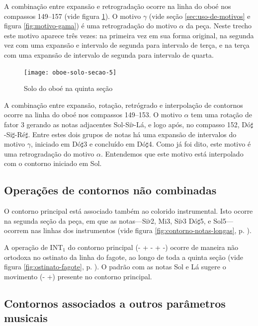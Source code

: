 A combinação entre expansão e retrogradação ocorre na linha do oboé
nos compassos 149--157 (vide figura \ref{fig:oboe-solo-secao-5}). O
motivo $\gamma$ (vide seção \ref{sec:uso-de-motivos} e figura
\ref{fig:motivo-gama}) é uma retrogradação do motivo $\alpha$ da
peça. Neste trecho este motivo aparece três vezes: na primeira vez em
sua forma original, na segunda vez com uma expansão e intervalo de
segunda para intervalo de terça, e na terça com uma expansão de
intervalo de segunda para intervalo de quarta.

\begin{figure}
  \centering
  \texttt{[image: oboe-solo-secao-5]}
  \caption{Solo do oboé na quinta seção}
  \label{fig:oboe-solo-secao-5}
\end{figure}

A combinação entre expansão, rotação, retrógrado e interpolação de
contornos ocorre na linha do oboé nos compassos 149--153. O motivo
$\alpha$ tem uma rotação de fator 3 gerando as notas adjacentes
Sol-Si$\flat$-Lá, e logo após, no compasso 152,
Dó$\sharp$-Si$\sharp$-Ré$\sharp$. Entre estes dois grupos de notas há
uma expansão de intervalos do motivo $\gamma$, iniciado em Dó$\sharp$3
e concluído em Dó$\sharp$4. Como já foi dito, este motivo é uma
retrogradação do motivo $\alpha$. Entendemos que este motivo está
interpolado com o contorno iniciado em Sol.

\subsection{Operações de contornos não combinadas}
\label{sec:cont-nao-comb}

O contorno principal \contpr{} está associado também ao colorido
instrumental. Isto ocorre na segunda seção da peça, em que as
notas---Si$\flat$2, Mi3, Si$\flat$3 Dó$\sharp$5, e Sol5---ocorrem nas
linhas dos instrumentos (vide figura \ref{fig:contorno-notas-longas},
p. \pageref{fig:contorno-notas-longas}).

A operação de INT$_1$ do contorno principal (- + - + -) ocorre de
maneira não ortodoxa no ostinato da linha do fagote, ao longo de toda
a quinta seção (vide figura \ref{fig:ostinato-fagote},
p. \pageref{fig:ostinato-fagote}). O padrão com as notas Sol e Lá
sugere o movimento (- +) presente no contorno principal.


\subsection{Contornos associados a outros parâmetros musicais}
\label{sec:cont-assoc-outr}


